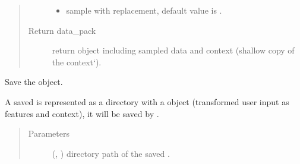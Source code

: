 \documentclass[letterpaper,10pt,english]{sphinxmanual}
\begin{document}
\begin{fulllineitems}
\begin{fulllineitems}
\begin{quote}
\begin{description}
\begin{itemize}
\item {} 
 \textendash{} sample with replacement, default value is .

\end{itemize}

\item[{Return data\_pack}] \leavevmode
return  object including sampled data
and context (shallow copy of the context{}`).

\end{description}\end{quote}

\end{fulllineitems}


\begin{fulllineitems}
\label{\detokenize{matchzoo:matchzoo.datapack.DataPack.save}}
Save the  object.

A saved  is represented as a directory with a 
object (transformed user input as features and context), it will be
saved by .
\begin{quote}\begin{description}
\item[{Parameters}] \leavevmode
{} (\sphinxcode{\sphinxupquote{Union}}{[}, \sphinxcode{\sphinxupquote{Path}}{]}) \textendash{} directory path of the saved .

\end{description}\end{quote}

\end{fulllineitems}


\end{fulllineitems}

\end{document}

